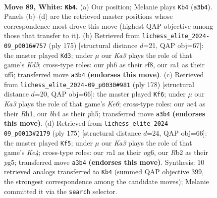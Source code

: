 \documentclass[11pt]{article}
\begin{document}
\clearpage

\begin{figure}[p]\centering
\begin{subfigure}{0.46\textwidth}\centering
\resizebox{\linewidth}{!}{%
\newchessgame
\chessboard[
  setfen={8/8/4k2p/3pp3/4n2b/K7/1R6/r7 w - - 2 89},
  showmover=false,
  pgfstyle=straightmove, color=movearrow, markmove={a3-b4}
]}
\caption{}
\end{subfigure}\hfill
\begin{subfigure}{0.46\textwidth}\centering
\resizebox{\linewidth}{!}{%
\newchessgame
\chessboard[
  setfen={5R2/8/8/5Np1/3k4/7P/r2n2PK/8 b - - 75 88},
  showmover=false,
  pgfstyle=straightmove, color=movearrow, markmove={d4-d3}
]}
\caption{}
\end{subfigure}
\\[4pt]
\begin{subfigure}{0.46\textwidth}\centering
\resizebox{\linewidth}{!}{%
\newchessgame
\chessboard[
  setfen={8/p3P3/4K2k/7p/4r3/8/7p/7R w - - 2 90},
  showmover=false,
  pgfstyle=straightmove, color=movearrow, markmove={e6-f6}
]}
\caption{}
\end{subfigure}\hfill
\begin{subfigure}{0.46\textwidth}\centering
\resizebox{\linewidth}{!}{%
\newchessgame
\chessboard[
  setfen={8/8/6N1/P3k1P1/7P/5PK1/8/1r6 b - - 0 88},
  showmover=false,
  pgfstyle=straightmove, color=movearrow, markmove={e5-f5}
]}
\caption{}
\end{subfigure}
\caption{\textbf{Move 89, White: \texttt{Kb4}.} (a) Our position; Melanie plays \texttt{Kb4} (\texttt{a3b4}). Panels (b)--(d) are the retrieved master positions whose correspondence most drove this move (highest QAP objective among those that transfer to it). (b) Retrieved from \texttt{lichess\_elite\_2024-09\_p0016\#757} (ply 175) [structural distance $d$=21, QAP obj=67]: the master played \texttt{Kd3}; under $\mu$ our \emph{Ka3} plays the role of that game's \emph{Kd5}; cross-type roles: our \emph{p}h6 as their \emph{r}f8, our \emph{r}a1 as their \emph{n}f5; transferred move \texttt{a3b4} \textbf{(endorses this move)}. (c) Retrieved from \texttt{lichess\_elite\_2024-09\_p0030\#981} (ply 178) [structural distance $d$=20, QAP obj=66]: the master played \texttt{Kf6}; under $\mu$ our \emph{Ka3} plays the role of that game's \emph{Ke6}; cross-type roles: our \emph{n}e4 as their \emph{R}h1, our \emph{b}h4 as their \emph{p}h5; transferred move \texttt{a3b4} \textbf{(endorses this move)}. (d) Retrieved from \texttt{lichess\_elite\_2024-09\_p0013\#2179} (ply 175) [structural distance $d$=24, QAP obj=66]: the master played \texttt{Kf5}; under $\mu$ our \emph{Ka3} plays the role of that game's \emph{Ke4}; cross-type roles: our \emph{r}a1 as their \emph{n}g6, our \emph{R}b2 as their \emph{p}g5; transferred move \texttt{a3b4} \textbf{(endorses this move)}. Synthesis: 10 retrieved analogs transferred to \texttt{Kb4} (summed QAP objective 399, the strongest correspondence among the candidate moves); Melanie committed it via the \texttt{search} selector.}
\label{fig:thought-m176}
\end{figure}
\end{document}
